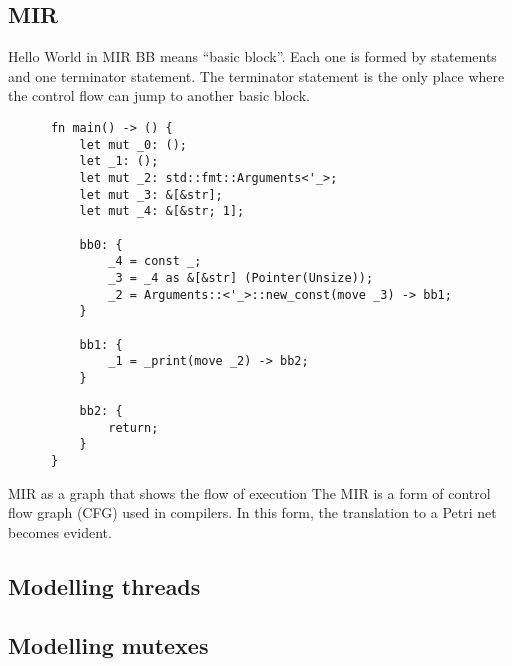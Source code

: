 \documentclass{beamer}
\begin{document}
\subsection{MIR}

\begin{frame}[fragile]{Hello World in MIR}
  \tiny
  BB means ``basic block''. Each one is formed by statements and one terminator statement.
  The terminator statement is the only place where the control flow can jump to another basic block.

  \begin{listing}
    \begin{verbatim}
      fn main() -> () {
          let mut _0: ();                     
          let _1: ();                         
          let mut _2: std::fmt::Arguments<'_>;
          let mut _3: &[&str];                
          let mut _4: &[&str; 1];             
      
          bb0: {
              _4 = const _;                    
              _3 = _4 as &[&str] (Pointer(Unsize));
              _2 = Arguments::<'_>::new_const(move _3) -> bb1;
          }
      
          bb1: {
              _1 = _print(move _2) -> bb2;
          }
      
          bb2: {
              return;
          }
      }      
    \end{verbatim}
  \end{listing}
\end{frame}

\begin{frame}{MIR as a graph that shows the flow of execution}
  \scriptsize
  The MIR is a form of control flow graph (CFG) used in compilers.
  In this form, the translation to a Petri net becomes evident.

  \begin{figure}[!htb]
    \centering
    
  \end{figure}
\end{frame}

\subsection{Modelling threads}

\subsection{Modelling mutexes}
\end{document}
